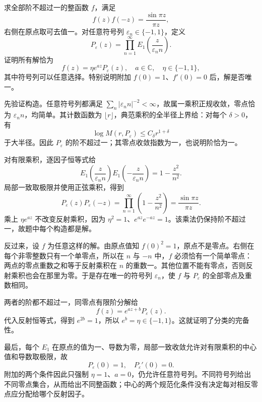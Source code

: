 \begin{exercise}[正弦乘积的反射因子]\label{b3:ex:20-draft-08}
求全部阶不超过一的整函数 \(f\)，满足
\[
 f(z)f(-z)=\frac{\sin\pi z}{\pi z},
\]
右侧在原点取可去值一。对任意符号列 \(\varepsilon_n\in\{-1,1\}\)，定义
\[
 P_{\varepsilon}(z)=\prod_{n=1}^\infty E_1\left(\frac{z}{\varepsilon_n n}\right).
\]
证明所有解恰为
\[
 f(z)=\eta e^{az}P_{\varepsilon}(z),
 \quad a\in\mathbb C,\quad\eta\in\{-1,1\},
\]
其中符号列可以任意选择。特别说明附加 \(f(0)=1\)、\(f'(0)=0\) 后，解是否唯一。
\end{exercise}
\begin{solution}
先验证构造。任意符号列都满足 \(\sum_n|\varepsilon_n n|^{-2}<\infty\)，故属一乘积正规收敛，零点恰为 \(\varepsilon_n n\)，均简单。其计数函数为 \(\lfloor r\rfloor\)，典范乘积的全半径上界给：对每个 \(\delta>0\)，有
\[
 \log M(r,P_{\varepsilon})\le C_\delta r^{1+\delta}
\]
于大半径。因此 \(P_{\varepsilon}\) 的阶不超过一；其零点收敛指数为一，也说明阶恰为一。

对有限乘积，逐因子恒等式给
\[
 E_1\left(\frac z{\varepsilon_n n}\right)
 E_1\left(-\frac z{\varepsilon_n n}\right)
 =1-\frac{z^2}{n^2}.
\]
局部一致取极限并使用正弦乘积，得到
\[
 P_{\varepsilon}(z)P_{\varepsilon}(-z)
 =\prod_{n=1}^\infty\left(1-\frac{z^2}{n^2}\right)
 =\frac{\sin\pi z}{\pi z}.
\]
乘上 \(\eta e^{az}\) 不改变反射乘积，因为 \(\eta^2=1\)、\(e^{az}e^{-az}=1\)。该乘法仍保持阶不超过一，故题中每个构造都是解。

反过来，设 \(f\) 为任意这样的解。由原点值知 \(f(0)^2=1\)，原点不是零点。右侧在每个非零整数只有一个单零点，所以在 \(n\) 与 \(-n\) 中，\(f\) 必须恰有一个简单零点：两点的零点重数之和等于反射乘积在 \(n\) 的重数一。其他位置不能有零点，否则反射乘积也会在那里为零。于是存在唯一的符号列 \(\varepsilon_n\)，使 \(f\) 与 \(P_{\varepsilon}\) 的全部零点及重数相同。

两者的阶都不超过一，同零点有限阶分解给
\[
 f(z)=e^{az+b}P_{\varepsilon}(z).
\]
代入反射恒等式，得到 \(e^{2b}=1\)，所以 \(e^b=\eta\in\{-1,1\}\)。这就证明了分类的完备性。

最后，每个 \(E_1\) 在原点的值为一、导数为零，局部一致收敛允许对有限乘积的中心值和导数取极限，故
\[
 P_{\varepsilon}(0)=1,\quad P_{\varepsilon}'(0)=0.
\]
附加的两个条件因此只强制 \(\eta=1\)、\(a=0\)，仍允许任意符号列。不同符号列给出不同零点集合，从而给出不同整函数；中心的两个规范化条件没有决定每对相反零点应分配给哪个反射因子。
\end{solution}
